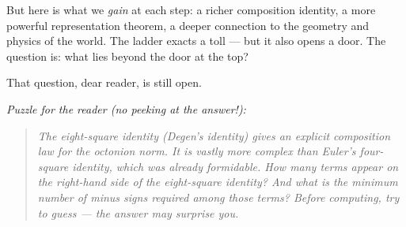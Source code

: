But here is what we \textit{gain} at each step: a richer composition identity, a more powerful representation theorem, a deeper connection to the geometry and physics of the world. The ladder exacts a toll --- but it also opens a door. The question is: what lies beyond the door at the top?

That question, dear reader, is still open.


\ornbreak


\textit{Puzzle for the reader (no peeking at the answer!):}

\begin{quote}
\textit{The eight-square identity (Degen's identity) gives an explicit composition law for the octonion norm. It is vastly more complex than Euler's four-square identity, which was already formidable. How many terms appear on the right-hand side of the eight-square identity? And what is the minimum number of minus signs required among those terms? Before computing, try to guess --- the answer may surprise you.}
\end{quote}

